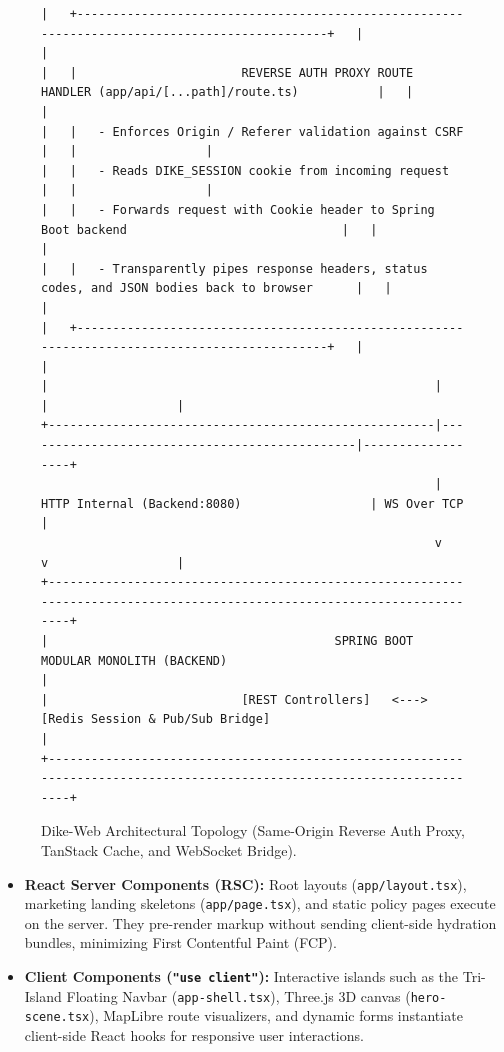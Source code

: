 \documentclass[conference,10pt,a4paper]{IEEEtran}
\begin{document}
\begin{figure}[!t]
\begin{lstlisting}[basicstyle=\ttfamily\fontsize{6pt}{7pt}\selectfont,frame=single,numbers=none]
|   +----------------------------------------------------------------------------------------------+   |                  |
|   |                       REVERSE AUTH PROXY ROUTE HANDLER (app/api/[...path]/route.ts)           |   |                  |
|   |   - Enforces Origin / Referer validation against CSRF                                        |   |                  |
|   |   - Reads DIKE_SESSION cookie from incoming request                                          |   |                  |
|   |   - Forwards request with Cookie header to Spring Boot backend                              |   |                  |
|   |   - Transparently pipes response headers, status codes, and JSON bodies back to browser      |   |                  |
|   +----------------------------------------------------------------------------------------------+   |                  |
|                                                      |                                               |                  |
+------------------------------------------------------|-----------------------------------------------|------------------+
                                                       | HTTP Internal (Backend:8080)                  | WS Over TCP      |
                                                       v                                               v                  |
+-------------------------------------------------------------------------------------------------------------------------+
|                                        SPRING BOOT MODULAR MONOLITH (BACKEND)                                           |
|                           [REST Controllers]   <--->   [Redis Session & Pub/Sub Bridge]                                 |
+-------------------------------------------------------------------------------------------------------------------------+
\end{lstlisting}
\caption{Dike-Web Architectural Topology (Same-Origin Reverse Auth Proxy, TanStack Cache, and WebSocket Bridge).}
\label{fig:web_arch}
\end{figure}

\begin{itemize}
    \item \textbf{React Server Components (RSC):} Root layouts (\texttt{app/layout.tsx}), marketing landing skeletons (\texttt{app/page.tsx}), and static policy pages execute on the server. They pre-render markup without sending client-side hydration bundles, minimizing First Contentful Paint (FCP).
    \item \textbf{Client Components (\texttt{"use client"}):} Interactive islands such as the Tri-Island Floating Navbar (\texttt{app-shell.tsx}), Three.js 3D canvas (\texttt{hero-scene.tsx}), MapLibre route visualizers, and dynamic forms instantiate client-side React hooks for responsive user interactions.
\end{itemize}
\end{document}
